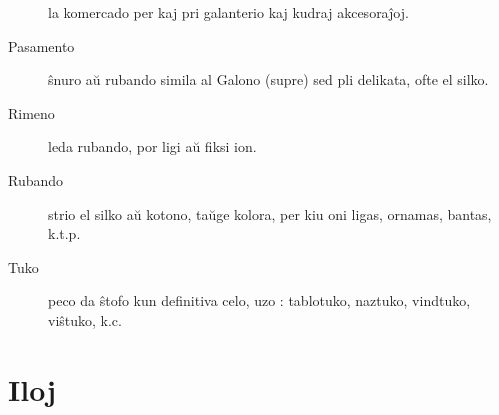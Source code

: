\begin{description}
 la komercado per kaj pri galanterio kaj kudraj akcesoraĵoj.

\item[Pasamento]

 ŝnuro aŭ rubando simila al Galono (supre) sed pli delikata, ofte el silko.

\item[Rimeno]

 leda rubando, por ligi aŭ fiksi ion.

\item[Rubando]

 strio el silko aŭ kotono, taŭge kolora, per kiu oni ligas, ornamas, bantas, k.t.p.

\item[Tuko]

 peco da ŝtofo kun definitiva celo, uzo : tablotuko, naztuko, vindtuko, viŝtuko, k.c.
\end{description}

\section[Iloj]{Iloj}
\hypertarget{Iloj}{}
\label{Iloj}


